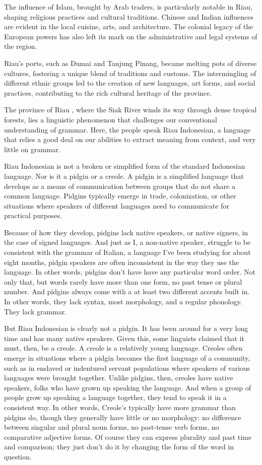 The influence of Islam, brought by Arab traders, is particularly notable in Riau, shaping religious practices and cultural traditions. Chinese and Indian influences are evident in the local cuisine, arts, and architecture. The colonial legacy of the European powers has also left its mark on the administrative and legal systems of the region.

Riau's ports, such as Dumai and Tanjung Pinang, became melting pots of diverse cultures, fostering a unique blend of traditions and customs. The intermingling of different ethnic groups led to the creation of new languages, art forms, and social practices, contributing to the rich cultural heritage of the province.


The province of Riau , where the Siak River winds its way through dense tropical forests, lies a linguistic phenomenon that challenges our conventional understanding of grammar. Here, the people speak Riau Indonesian, a language that relies a good deal on our abilities to extract meaning from context, and very little on grammar.

Riau Indonesian is not a broken or simplified form of the standard Indonesian language. Nor is it a pidgin or a creole. A pidgin is a simplified language that develops as a means of communication between groups that do not share a common language. Pidgins typically emerge in trade, colonization, or other situations where speakers of different languages need to communicate for practical purposes. 

Because of how they develop, pidgins lack native speakers, or native signers, in the case of signed languages. And just as I, a non-native speaker, struggle to be consistent with the grammar of Italian, a language I've been studying for about eight months, pidgin speakers are often inconsistent in the way they use the language. In other words, pidgins don't have have any particular word order. Not only that, but words rarely have more than one form, no past tense or plural number. And pidgins always come with a at least two different accents built in. In other words, they lack syntax, most morphology, and a regular phonology. They lack grammar.

But Riau Indonesian is clearly not a pidgin. It has been around for a very long time and has many native speakers. Given this, some linguists claimed that it must, then, be a creole. A creole is a relatively young language. Creoles often emerge in situations where a pidgin becomes the first language of a community, such as in enslaved or indentured servant populations where speakers of various languages were brought together. Unlike pidgins, then, creoles have native speakers, folks who have grown up speaking the language. And when a group of people grow up speaking a language together, they tend to speak it in a consistent way. In other words, Creole's typically have more grammar than pidgins do, though they generally have little or no morphology: no difference between singular and plural noun forms, no past-tense verb forms, no comparative adjective forms. Of course they can express plurality and past time and comparison; they just don't do it by changing the form of the word in question.

